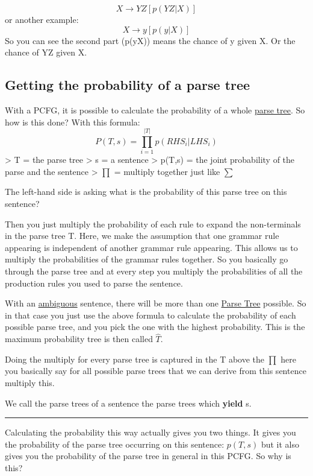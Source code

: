 \documentclass[
  11pt,
  british,
]{article}
\begin{document}
\[X \rightarrow YZ[p(YZ|X)]\] or another example:
\[X \rightarrow y[p(y|X)]\] So you can see the second part
(p(y\textbar X)) means the chance of y given X. Or the chance of YZ
given X.

\hypertarget{getting-the-probability-of-a-parse-tree}{%
\subsection{Getting the probability of a parse
tree}\label{getting-the-probability-of-a-parse-tree}}

With a PCFG, it is possible to calculate the probability of a whole
\href{Parse\%20Tree.md}{parse tree}. So how is this done? With this
formula: \[P(T, s) = \prod^{|T|}_{i=1}{p(RHS_i|LHS_i)}\] \textgreater{}
T = the parse tree \textgreater{} s = a sentence \textgreater{} p(T,s) =
the joint probability of the parse and the sentence \textgreater{}
\(\prod\) = multiply together just like \(\sum\limits\)

The left-hand side is asking what is the probability of this parse tree
on this sentence?

Then you just multiply the probability of each rule to expand the
non-terminals in the parse tree T. Here, we make the assumption that one
grammar rule appearing is independent of another grammar rule appearing.
This allows us to multiply the probabilities of the grammar rules
together. So you basically go through the parse tree and at every step
you multiply the probabilities of all the production rules you used to
parse the sentence.

With an \href{Ambiguity.md}{ambiguous} sentence, there will be more than
one \href{Parse\%20Tree.md}{Parse Tree} possible. So in that case you
just use the above formula to calculate the probability of each possible
parse tree, and you pick the one with the highest probability. This is
the maximum probability tree is then called \(\hat{T}\).

Doing the multiply for every parse tree is captured in the
\textbar T\textbar{} above the \(\prod\) here you basically say for all
possible parse trees that we can derive from this sentence multiply
this.

We call the parse trees of a sentence the parse trees which
\textbf{yield} s.

\begin{center}\rule{0.5\linewidth}{0.5pt}\end{center}

Calculating the probability this way actually gives you two things. It
gives you the probability of the parse tree occurring on this sentence:
\(p(T,s)\) but it also gives you the probability of the parse tree in
general in this PCFG. So why is this?
\end{document}
